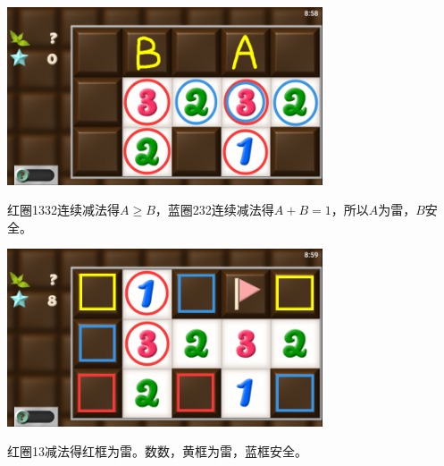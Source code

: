 \subsection{} %
\begin{center}
    \includegraphics[width=0.7\textwidth]{puzzle/114-1.png}
\end{center}
红圈1332连续减法得$A\ge B$，蓝圈232连续减法得$A+B=1$，所以$A$为雷，$B$安全。
\begin{center}
    \includegraphics[width=0.7\textwidth]{puzzle/114-2.png}
\end{center}
红圈13减法得红框为雷。数数，黄框为雷，蓝框安全。

